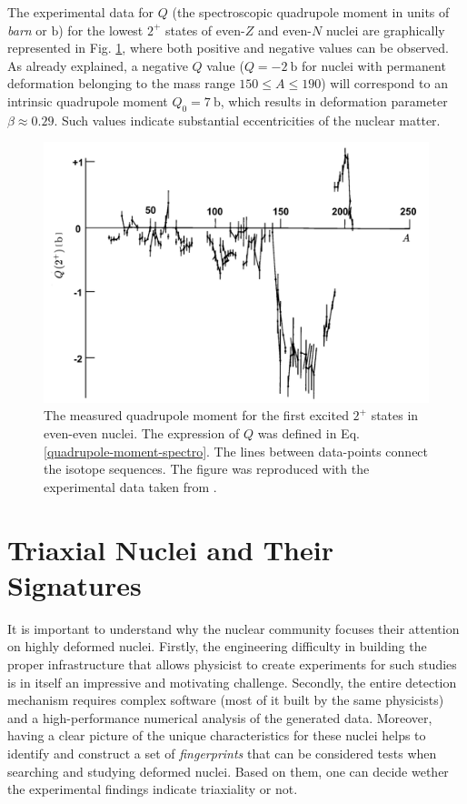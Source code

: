 The experimental data for $Q$ (the spectroscopic quadrupole moment in units of \emph{barn} or $\text{b}$) for the lowest $2^+$ states of even-$Z$ and even-$N$ nuclei are graphically represented in Fig. \ref{experimental-quadrupole-2Plus-states}, where both positive and negative values can be observed. As already explained, a negative $Q$ value ($Q=-2\ \text{b}$ for nuclei with permanent deformation belonging to the mass range $150\leq A \leq 190$) will correspond to an intrinsic quadrupole moment $Q_0=7\ \text{b}$, which results in deformation parameter $\beta\approx 0.29$. Such values indicate substantial eccentricities of the nuclear matter.
\begin{figure}
    \centering
    \includegraphics[scale=0.25]{Chapters/Figures/2Plus_spectroscopicQ.pdf}
    \caption{The measured quadrupole moment for the first excited $2^+$ states in even-even nuclei. The expression of $Q$ was defined in Eq. \eqref{quadrupole-moment-spectro}. The lines between data-points connect the isotope sequences. The figure was reproduced with the experimental data taken from \cite{krane1991introductory}.}
    \label{experimental-quadrupole-2Plus-states}
\end{figure}

\section{Triaxial Nuclei and Their Signatures}
\label{section-triaxial-signatures}

It is important to understand why the nuclear community focuses their attention on highly deformed nuclei. Firstly, the engineering difficulty in building the proper infrastructure that allows physicist to create experiments for such studies is in itself an impressive and motivating challenge. Secondly, the entire detection mechanism requires complex software (most of it built by the same physicists) and a high-performance numerical analysis of the generated data. Moreover, having a clear picture of the unique characteristics for these nuclei helps to identify and construct a set of \emph{fingerprints} that can be considered tests when searching and studying deformed nuclei. Based on them, one can decide wether the experimental findings indicate triaxiality or not.

